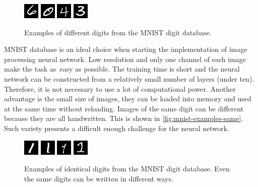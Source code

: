\begin{figure}[!h]
    \centering
    \includegraphics[scale=3]{figures/mnist/example_6_4337.png}
    \includegraphics[scale=3]{figures/mnist/example_0_10705.png}
    \includegraphics[scale=3]{figures/mnist/example_4_10104.png}
    \includegraphics[scale=3]{figures/mnist/example_3_10074.png}
    \caption{\label{fig:mnist-examples-different}Examples of different digits from the MNIST digit database.}
\end{figure}

MNIST database is an ideal choice when starting the implementation of image processing neural network. Low resolution and only one channel of each image make the task as~easy as possible. The training time is short and the neural network can be constructed from a relatively small number of layers (under ten). Therefore, it is not necessary to use a lot of computational power. Another advantage is the small size of images, they can be loaded into memory and used at the same time without reloading. Images of the same digit can be different because they are all handwritten. This is shown in \autoref{fig:mnist-examples-same}. Such variety presents a difficult enough challenge for the neural network.

\begin{figure}[!h]
    \centering
    \includegraphics[scale=3]{figures/mnist/example_1_55832.png}
    \includegraphics[scale=3]{figures/mnist/example_1_10364.png}
    \includegraphics[scale=3]{figures/mnist/example_1_10048.png}
    \includegraphics[scale=3]{figures/mnist/example_1_55870.png}
    \caption{\label{fig:mnist-examples-same}Examples of identical digits from the MNIST digit database. Even the same digits can be written in different ways.}
\end{figure}

